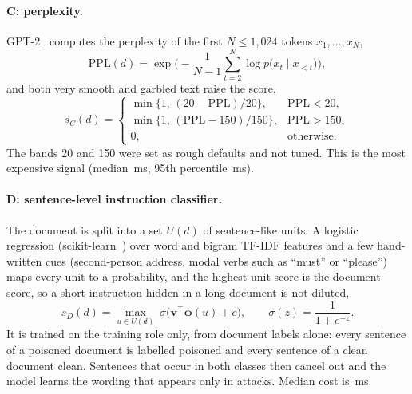 \paragraph{C: perplexity.}
GPT-2~\cite{radford2019gpt2} computes the perplexity of the first $N\le 1{,}024$ tokens $x_1,\dots,x_N$,
\begin{equation}
    \mathrm{PPL}(d)=\exp\!\Big(-\frac{1}{N-1}\sum_{t=2}^{N}\log p\big(x_t\mid x_{<t}\big)\Big),
    \label{eq:ppl}
\end{equation}
and both very smooth and garbled text raise the score,
\begin{equation}
    s_C(d)=\begin{cases}
        \min\{1,\,(20-\mathrm{PPL})/20\}, & \mathrm{PPL}<20,\\[2pt]
        \min\{1,\,(\mathrm{PPL}-150)/150\}, & \mathrm{PPL}>150,\\[2pt]
        0, & \text{otherwise.}
    \end{cases}
    \label{eq:pplscore}
\end{equation}
The bands 20 and 150 were set as rough defaults and not tuned. This is the most
expensive signal (median \resLatMedPpl\,ms, 95th percentile
\resLatPNinetyFivePpl\,ms).

\paragraph{D: sentence-level instruction classifier.}
The document is split into a set $U(d)$ of sentence-like units. A logistic
regression (scikit-learn~\cite{pedregosa2011sklearn}) over word and bigram TF-IDF features and a few hand-written cues
(second-person address, modal verbs such as ``must'' or ``please'') maps every
unit to a probability, and the highest unit score is the document score, so a
short instruction hidden in a long document is not diluted,
\begin{equation}
    s_D(d)=\max_{u\in U(d)}\ \sigma\big(\mathbf{v}^{\top}\boldsymbol{\phi}(u)+c\big),\qquad
    \sigma(z)=\frac{1}{1+e^{-z}}.
    \label{eq:sentence}
\end{equation}
It is trained on the training role only, from document labels alone: every
sentence of a poisoned document is labelled poisoned and every sentence of a
clean document clean. Sentences that occur in both classes then cancel out and
the model learns the wording that appears only in attacks. Median cost is
\resLatMedSen\,ms.

